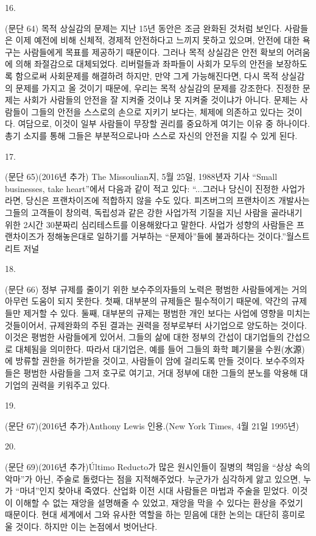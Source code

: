 \documentclass[11pt,a4paper]{article}
\begin{document}
\begin{multicols}{2}
\hypertarget{16}{16.} (문단 64) 목적 상실감의 문제는 지난 15년 동안은 조금 완화된 것처럼 보인다. 사람들은 이제  예전에 비해 신체적, 경제적 안전하다고 느끼지 못하고 있으며, 안전에 대한 욕구는 사람들에게 목표를  제공하기 때문이다. 그러나 목적 상실감은 안전 확보의 어려움에 의해 좌절감으로 대체되었다.  리버럴들과 좌파들이 사회가 모두의 안전을 보장하도록 함으로써 사회문제를 해결하려 하지만, 만약 그게 가능해진다면, 다시 목적 상실감의 문제를 가지고 올 것이기 때문에, 우리는 목적 상실감의 문제를  강조한다. 진정한 문제는 사회가 사람들의 안전을 잘 지켜줄 것이냐 못 지켜줄 것이냐가 아니다. 문제는  사람들이 그들의 안전을 스스로의 손으로 지키기 보다는, 체제에 의존하고 있다는 것이다. 여담으로,  이것이 일부 사람들이 무장할 권리를 중요하게 여기는 이유 중 하나이다. 총기 소지를 통해 그들은  부분적으로나마 스스로 자신의 안전을 지킬 수 있게 된다. 


\hypertarget{17}{17.} (문단 65)(2016년 추가) \textlangle{}The Missoulian\textrangle{}지, 5월 25일, 1988년자 기사 “Small businesses, take heart”에서 다음과 같이 적고 있다: “...그러나 당신이 진정한 사업가라면, 당신은 프랜차이즈에 적합하지  않을 수도 있다. 피츠버그의 프랜차이즈 개발사는 그들의 고객들이 창의력, 독립성과 같은 강한 사업가적  기질을 지닌 사람을 골라내기 위한 2시간 30분짜리 심리테스트를 이용해왔다고 말한다. 사업가 성향의 사람들은 프랜차이즈가 정해놓은대로 일하기를 거부하는 “문제아”들에 불과하다는 것이다.”\textlangle{}월스트리트 저널\textrangle{}


\hypertarget{18}{18.} (문단 66) 정부 규제를 줄이기 위한 보수주의자들의 노력은 평범한 사람들에게는 거의 아무런 도움이 되지 못한다. 첫째, 대부분의 규제들은 필수적이기 때문에, 약간의 규제들만 제거할 수 있다. 둘째, 대부분의 규제는 평범한 개인 보다는 사업에 영향을 미치는 것들이어서, 규제완화의 주된 결과는 권력을 정부로부터 사기업으로 양도하는 것이다. 이것은 평범한 사람들에게 있어서, 그들의 삶에 대한 정부의  간섭이 대기업들의 간섭으로 대체됨을 의미한다. 따라서 대기업은, 예를 들어 그들의 화학 폐기물을 수원(水源)에 방류할 권한을 허가받을 것이고, 사람들이 암에 걸리도록 만들 것이다. 보수주의자들은 평범한  사람들을 그저 호구로 여기고, 거대 정부에 대한 그들의 분노를 악용해 대기업의 권력을 키워주고 있다. 


\hypertarget{19}{19.} (문단 67)(2016년 추가)Anthony Lewis 인용.(New York Times, 4월 21일 1995년) 


\hypertarget{20}{20.} (문단 69)(2016년 추가)Último Reducto가 많은 원시인들이 질병의 책임을 “상상 속의 악마”가  아닌, 주술로 돌렸다는 점을 지적해주었다. 누군가가 심각하게 앓고 있으면, 누가 “마녀”인지 찾아내  죽였다. 산업화 이전 시대 사람들은 마법과 주술을 믿었다. 이것이 이해할 수 없는 재앙을 설명해줄 수  있었고, 재앙을 막을 수 있다는 환상을 주었기 때문이다. 현대 세계에서 그와 유사한 역할을 하는 믿음에  대한 논의는 대단히 흥미로울 것이다. 하지만 이는 논점에서 벗어난다. 



\end{multicols}
\end{document}
